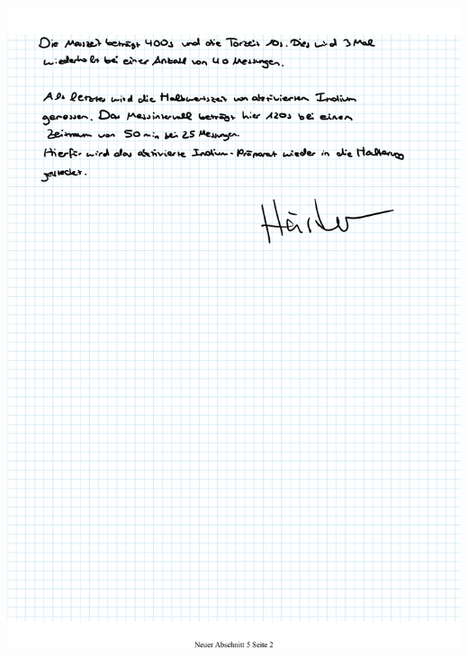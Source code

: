 \documentclass{article}
\begin{document}
\includegraphics[width=\textwidth]{graphics/mess2.jpg}
\newpage





\clearpage
\newpage
\end{document}
